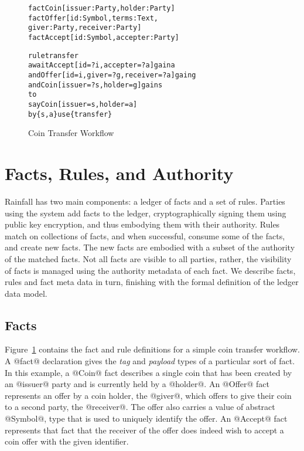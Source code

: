 
\clearpage{}


\begin{figure}
\begin{small}
\begin{alltt}
fact  Coin   [issuer: Party, holder: Party]
fact  Offer  [id: Symbol,   terms: Text,
              giver: Party, receiver: Party ]
fact  Accept [id: Symbol,   accepter: Party]

rule  transfer
await Accept [id = ?i, accepter = ?a]  gain a
  and Offer  [id = i,  giver = ?g, receiver = ?a] gain g
  and Coin   [issuer = ?s, holder = g] gain s
to
  say Coin   [issuer = s, holder = a]
   by \{s, a\} use \{transfer\}
\end{alltt}
\end{small}
\caption{Coin Transfer Workflow}
\label{f:CoinTransfer}
\end{figure}


\section{Facts, Rules, and Authority}
\label{s:FactsWeights}
Rainfall has two main components: a ledger of facts and a set of rules. Parties using the system add facts to the ledger, cryptographically signing them using public key encryption, and thus embodying them with their authority. Rules match on collections of facts, and when successful, consume some of the facts, and create new facts. The new facts are embodied with a subset of the authority of the matched facts. Not all facts are visible to all parties, rather, the visibility of facts is managed using the authority metadata of each fact. We describe facts, rules and fact meta data in turn, finishing with the formal definition of the ledger data model.


\subsection{Facts}
\label{s:Facts}
Figure~\ref{f:CoinTransfer} contains the fact and rule definitions for a simple coin transfer workflow. A @fact@ declaration gives the \emph{tag} and \emph{payload} types of a particular sort of fact. In this example, a @Coin@ fact describes a single coin that has been created by an @issuer@ party and is currently held by a @holder@. An @Offer@ fact represents an offer by a coin holder, the @giver@, which offers to give their coin to a second party, the @receiver@. The offer also carries a value of abstract @Symbol@, type that is used to uniquely identify the offer. An @Accept@ fact represents that fact that the receiver of the offer does indeed wish to accept a coin offer with the given identifier.

